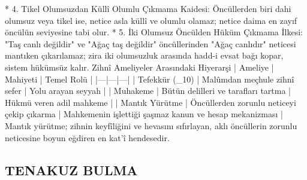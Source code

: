 \documentclass[11pt,a4paper]{article}
\begin{document}
 * 4. Tikel Olumsuzdan Küllî Olumlu Çıkmama Kaidesi:
   Öncüllerden biri dahi olumsuz veya tikel ise, netice asla küllî ve olumlu olamaz; netice daima en zayıf öncülün seviyesine tabi olur.
 * 5. İki Olumsuz Öncülden Hüküm Çıkmama İlkesi:
   "Taş canlı değildir" ve "Ağaç taş değildir" öncüllerinden "Ağaç canlıdır" neticesi mantıken çıkarılamaz; zira iki olumsuzluk arasında hadd-i evsat bağı kopar, sistem hükümsüz kalır.
Zihnî Ameliyeler Arasındaki Hiyerarşi
| Ameliye | Mahiyeti | Temel Rolü |
|---|---|---|
| Tefekkür (_{10}) | Malûmdan meçhule zihnî sefer | Yolu arayan seyyah |
| Muhakeme | Bütün delilleri ve tarafları tartma | Hükmü veren adil mahkeme |
| Mantık Yürütme | Öncüllerden zorunlu neticeyi çekip çıkarma | Mahkemenin işlettiği şaşmaz kanun ve hesap mekanizması |
Mantık yürütme; zihnin keyfîliğini ve hevasını sıfırlayan, aklı öncüllerin zorunlu neticesine boyun eğdiren en kat'î hendesedir.




\subsection{TENAKUZ BULMA}
\end{document}
